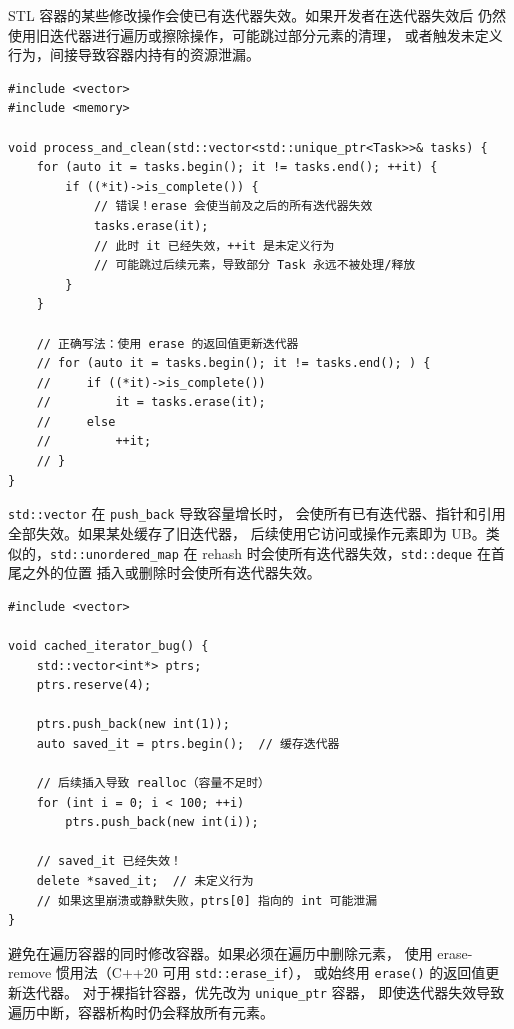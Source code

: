\documentclass[12pt,a4paper,fontset=fandol]{ctexbook}
\begin{document}
STL 容器的某些修改操作会使已有迭代器失效。如果开发者在迭代器失效后
仍然使用旧迭代器进行遍历或擦除操作，可能跳过部分元素的清理，
或者触发未定义行为，间接导致容器内持有的资源泄漏。

\begin{lstlisting}[style=cppstyle, caption={vector 迭代器失效导致跳过释放}]
#include <vector>
#include <memory>

void process_and_clean(std::vector<std::unique_ptr<Task>>& tasks) {
    for (auto it = tasks.begin(); it != tasks.end(); ++it) {
        if ((*it)->is_complete()) {
            // 错误！erase 会使当前及之后的所有迭代器失效
            tasks.erase(it);
            // 此时 it 已经失效，++it 是未定义行为
            // 可能跳过后续元素，导致部分 Task 永远不被处理/释放
        }
    }

    // 正确写法：使用 erase 的返回值更新迭代器
    // for (auto it = tasks.begin(); it != tasks.end(); ) {
    //     if ((*it)->is_complete())
    //         it = tasks.erase(it);
    //     else
    //         ++it;
    // }
}
\end{lstlisting}

\texttt{std::vector} 在 \texttt{push\_back} 导致容量增长时，
会使所有已有迭代器、指针和引用全部失效。如果某处缓存了旧迭代器，
后续使用它访问或操作元素即为 UB。类似的，\texttt{std::unordered\_map}
在 rehash 时会使所有迭代器失效，\texttt{std::deque} 在首尾之外的位置
插入或删除时会使所有迭代器失效。

\begin{lstlisting}[style=cppstyle, caption={缓存迭代器在容器增长后失效}]
#include <vector>

void cached_iterator_bug() {
    std::vector<int*> ptrs;
    ptrs.reserve(4);

    ptrs.push_back(new int(1));
    auto saved_it = ptrs.begin();  // 缓存迭代器

    // 后续插入导致 realloc（容量不足时）
    for (int i = 0; i < 100; ++i)
        ptrs.push_back(new int(i));

    // saved_it 已经失效！
    delete *saved_it;  // 未定义行为
    // 如果这里崩溃或静默失败，ptrs[0] 指向的 int 可能泄漏
}
\end{lstlisting}

\begin{note}[title={安全实践}]
避免在遍历容器的同时修改容器。如果必须在遍历中删除元素，
使用 erase-remove 惯用法（C++20 可用 \texttt{std::erase\_if}），
或始终用 \texttt{erase()} 的返回值更新迭代器。
对于裸指针容器，优先改为 \texttt{unique\_ptr} 容器，
即使迭代器失效导致遍历中断，容器析构时仍会释放所有元素。
\end{note}
\end{document}
